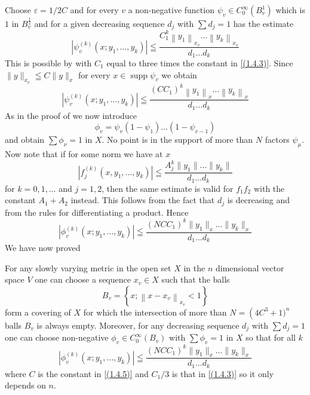 Choose $\varepsilon=1 / 2 C$ and for every $v$ a non-negative function $\psi_{v} \in C_{0}^{\infty}\left(B_{v}^{1}\right)$ which is $1$ in $B_{v}^{\frac{1}{2}}$ and for a given decreasing sequence $d_{j}$ with $\sum d_{j}=1$ has the estimate
\[
	\left|\psi_{v}^{(k)}\left(x ; y_{1}, \ldots, y_{k}\right)\right| \leqq \frac{C_{1}^{k}\left\|y_{1}\right\|_{x_{v}} \ldots\left\|y_{k}\right\|_{x_{v}}}{d_{1} \ldots d_{k}}
\]
This is possible by  with $C_{1}$ equal to three times the constant in \eqref{(1.4.3)}. Since $\|y\|_{x_{\nu}} \leqq C\|y\|_{x}$ for every $x \in \operatorname{supp} \psi_{v}$ we obtain
\[
	\left|\psi_{v}^{(k)}\left(x ; y_{1}, \ldots, y_{k}\right)\right| \leqq \frac{\left(C C_{1}\right)^{k}\left\|y_{1}\right\|_{x} \ldots\left\|y_{k}\right\|_{x}}{d_{1} \ldots d_{k}}
\]
As in the proof of  we now introduce
\[
	\phi_{v}=\psi_{v}\left(1-\psi_{1}\right) \ldots\left(1-\psi_{v-1}\right)
\]
and obtain $\sum \phi_{\nu}=1$ in $X$. No point is in the support of more than $N$ factors $\psi_{\mu}$. Now note that if for some norm we have at $x$
\[
	\left|f_{j}^{(k)}\left(x, y_{1}, \ldots, y_{k}\right)\right| \leqq \frac{A_{j}^{k}\| y_{1}\|\ldots\| y_{k} \|}{d_{1} \ldots d_{k}}
\]
for $k=0,1, \ldots$ and $j=1,2$, then the same estimate is valid for $f_{1} f_{2}$ with the constant $A_{1}+A_{2}$ instead. This follows from the fact that $d_{j}$ is decreasing and from the rules for differentiating a product. Hence
\[
	\left|\phi_{v}^{(k)}\left(x ; y_{1}, \ldots, y_{k}\right)\right| \leqq\frac{\left(N C C_{1}\right)^{k}\|y_{1}\|_{x} \ldots\| y_{k} \|_{x}}{d_{1} \ldots d_{k}}
\]
We have now proved
\begin{theorem}
    For any slowly varying metric in the open set $X$ in the $n$ dimensional vector space $V$ one can choose a sequence $x_{v} \in X$ such that the balls
\[
	B_{v}=\left\{x ;\left\|x-x_{v}\right\|_{x_{v}}<1\right\}
\]
form a covering of $X$ for which the intersection of more than $N=\left(4 C^{3}\right.+1)^{n}$ balls $B_{v}$ is always empty. Moreover, for any decreasing sequence $d_{j}$ with $\sum d_{j}=1$ one can choose non-negative $\phi_{v} \in C_{0}^{\infty}\left(B_{v}\right)$ with $\sum \phi_{v}=1$ in $X$ so that for all $k$
\begin{equation}
    \label{(1.4.7)}
	\left|\phi_{v}^{(k)}\left(x ; y_{1}, \ldots, y_{k}\right)\right| \leqq\frac{\left(N C C_{1}\right)^{k}\|y_{1}\|_{x} \ldots\| y_{k} \|_{x}}{d_{1} \ldots d_{k}}
\end{equation}
where $C$ is the constant in \eqref{(1.4.5)} and $C_{1} / 3$ is that in \eqref{(1.4.3)} so it only depends on $n$.
\end{theorem}
